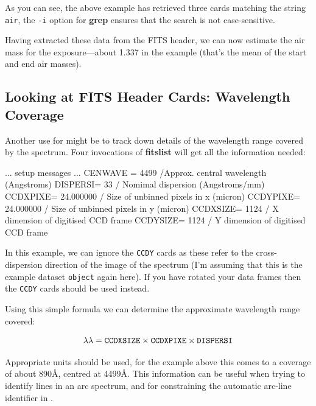 \documentclass[twoside,11pt]{starlink}
\providecommand{\mlabel}[1]{\xlabel{#1}\label{#1}}
\providecommand{\scspec}[2]{#1}
\begin{document}
As you can see, the above example has retrieved three cards matching the
string \verb+air+, the \verb+-i+ option for \textbf{grep} ensures that the
search is not case-sensitive.

Having extracted these data from the FITS header, we can now estimate
the air mass for the exposure\scspec{---}{ - }about 1.337 in the example
(that's the mean of the start and end air masses).


\subsection{\mlabel{cook_wavelength}Looking at FITS Header Cards:
            Wavelength Coverage}

Another use for  might be to
track down details of the wavelength range covered by the spectrum.
Four invocations of \textbf{fitslist} will get all the information needed:

{
\scspec{\small}{ }
\begin{terminalv}
   ... setup messages ...
   CENWAVE =                 4499 /Approx. central wavelength (Angstroms)
   DISPERSI=                   33 / Nomimal dispersion (Angstroms/mm)
   CCDXPIXE=            24.000000 / Size of unbinned pixels in x (micron)
   CCDYPIXE=            24.000000 / Size of unbinned pixels in y (micron)
   CCDXSIZE=                 1124 / X dimension of digitised CCD frame
   CCDYSIZE=                 1124 / Y dimension of digitised CCD frame
\end{terminalv}
}

In this example, we can ignore the \verb+CCDY+ cards as these refer
to the cross-dispersion direction of the image of the spectrum (I'm
assuming that this is the example dataset \verb+object+ again here).
If you have rotated your data frames then the \verb+CCDY+ cards
should be used instead.

Using this simple formula we can determine
the approximate wavelength range covered:

\begin{displaymath}
\lambda\lambda = {\tt{CCDXSIZE}} \times {\tt{CCDXPIXE}} \times {\tt{DISPERSI}}
\end{displaymath}

Appropriate units should be used, for the example above this comes to
a coverage of about 890\AA , centred at 4499\AA\@.  This information can
be useful when trying to identify lines in an arc spectrum, and for
constraining the automatic arc-line identifier in
\@.
\end{document}

